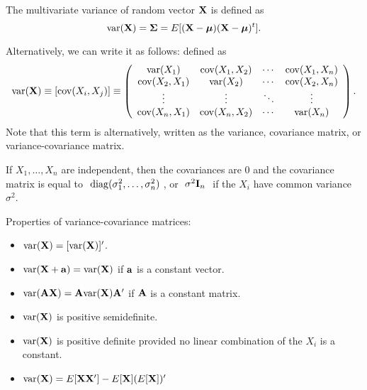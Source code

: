 The multivariate variance of random vector $\mathbf{X}$ is defined as 
$$
\mathrm{var}(\mathbf{X}) = \boldsymbol{\Sigma} = E[(\mathbf{X} - \boldsymbol{\mu})(\mathbf{X} - \boldsymbol{\mu})^t].
$$

Alternatively, we can write it as follows:
defined as
\begin{eqnarray*}
\mathrm{var}(\mathbf{X})\equiv[\mathrm{cov}(X_i,X_j)]
\equiv
\left(\begin{array}{cccc}
	\mathrm{var}(X_1)&\mathrm{cov}(X_1,X_2)&\cdots&\mathrm{cov}(X_1,X_n)\\
	\mathrm{cov}(X_2,X_1)&\mathrm{var}(X_2)&\cdots&\mathrm{cov}(X_2,X_n)\\
	\vdots&\vdots&\ddots&\vdots\\
	\mathrm{cov}(X_n,X_1)&\mathrm{cov}(X_n,X_2)&\cdots&\mathrm{var}(X_n)\\
\end{array}\right).
\end{eqnarray*}
Note that this term is alternatively, written as the variance, covariance matrix, or variance-covariance matrix.


\bexa
If $X_1,\ldots,X_n$ are independent, then the covariances are 0 and
the covariance matrix is equal to $\
\mathrm{diag}(\sigma_1^2,\ldots,\sigma_n^2)\ $, or $\ \sigma^2 \mathbf{I}_n\ $ if
the $X_i$ have common variance $\sigma^2$.
\eexa



Properties of variance-covariance matrices:
\begin{itemize}
\item  $\mathrm{var}(\mathbf{X})=[\mathrm{var}(\mathbf{X})]'$.

\item $\mathrm{var}(\mathbf{X}+\mathbf{a})=\mathrm{var}(\mathbf{X})$ if $\mathbf{a}$ is a constant vector.

\item $\mathrm{var}(\mathbf{A}\mathbf{X})=\mathbf{A}\mathrm{var}(\mathbf{X})\mathbf{A}'$ if $\mathbf{A}$ is a constant matrix.

\item $\mathrm{var}(\mathbf{X})$ is positive semidefinite.

\item $\mathrm{var}(\mathbf{X})$ is positive definite provided no linear combination of the $X_i$ is a
constant.

\item $\mathrm{var}(\mathbf{X})=E[\mathbf{X}\mathbf{X}'] - E[\mathbf{X}](E[\mathbf{X}])'$
\end{itemize}



%


